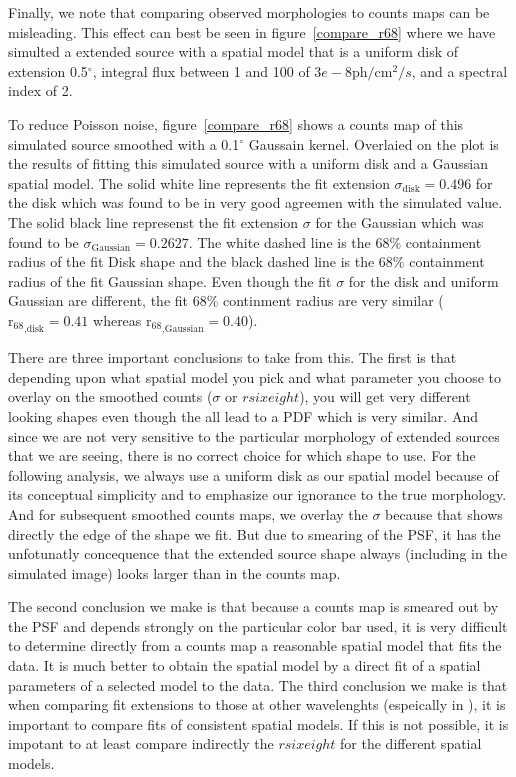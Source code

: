 \documentclass[preprint]{aastex}
\newcommand{\gev}{\text{GeV}\xspace}
\newcommand{\tev}{\text{TeV}\xspace}
\newcommand{\ph}{\text{ph}\xspace}
\newcommand{\cm}{\text{cm}\xspace}
\newcommand{\rsixeight}{{\ensuremath{\text{r}_{68}}}\xspace}
\renewcommand{\deg}{\ensuremath{^\circ}\xspace}
\begin{document}
Finally, we note that comparing observed morphologies to 
counts maps can be misleading.  This effect can best be seen
in figure~\ref{compare_r68} where we have simulted a
extended source with 
a spatial model that is a uniform disk of extension 0.5\deg,
integral flux between 1 \gev and 100 \gev of $3e-8\ph/\cm^2/s$,
and a spectral index of 2. 

To reduce Poisson noise, figure~\ref{compare_r68} shows a counts map of
this simulated source smoothed with a 0.1\deg Gaussain kernel.  Overlaied
on the plot is the results of fitting this simulated source with a uniform
disk and a Gaussian spatial model.  The solid white line represents the
fit extension $\sigma_\text{disk}=0.496$ for the disk which was found to
be in very good agreemen with the simulated value.  The solid black line
represenst the fit extension $\sigma$ for the Gaussian which was found to
be $\sigma_\text{Gaussian}=0.2627$.  The white dashed line is the 68\%
containment radius of the fit Disk shape and the black dashed line is
the 68\% containment radius of the fit Gaussian shape.  Even though the
fit $\sigma$ for the disk and uniform Gaussian are different, the fit
68\% continment radius are very similar ($\rsixeight_\text{,disk}=0.41$
whereas $\rsixeight_\text{,Gaussian}=0.40$).

There are three important conclusions to take from this. The first is
that depending upon what spatial model you pick and what parameter you
choose to overlay on the smoothed counts ($\sigma$ or $rsixeight$),
you will get very different looking shapes even though the all lead
to a PDF which is very similar. And since we are not very sensitive
to the particular morphology of extended sources that we are seeing,
there is no correct choice for which shape to use. For the following
analysis, we always use a uniform disk as our spatial model because
of its conceptual simplicity and to emphasize our ignorance to the
true morphology. And for subsequent smoothed counts maps, we overlay
the $\sigma$ because that shows directly the edge of the shape we fit.
But due to smearing of the PSF, it has the unfotunatly concequence that
the extended source shape always (including in the simulated image)
looks larger than in the counts map.

The second conclusion we make is that because a counts map is smeared
out by the PSF and depends strongly on the particular color bar used, it
is very difficult to determine directly from a counts map a reasonable
spatial model that fits the data.  It is much better to obtain the
spatial model by a direct fit of a spatial parameters of a selected
model to the data.  The third conclusion we make is that when comparing
fit extensions to those at other wavelenghts (espeically in \tev), it is
important to compare fits of consistent spatial models. If this is not
possible, it is impotant to at least compare indirectly the $rsixeight$
for the different spatial models.
\end{document}

